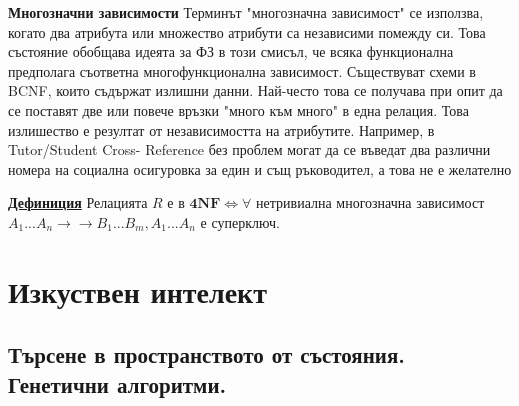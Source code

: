 \documentclass{article}
\begin{document}
\textbf{Многозначни зависимости}
Терминът "многозначна зависимост" се използва, когато два атрибута или множество атрибути са независими помежду си. Това
състояние обобщава идеята за ФЗ в този смисъл, че всяка функционална предполага съответна многофункционална зависимост.
Съществуват схеми в BCNF, които съдържат излишни данни. Най-често това се получава при опит да се поставят две или повече
връзки "много към много" в една релация. Това излишество е резултат от независимостта на атрибутите. Например, в Tutor/Student Cross-
Reference без проблем могат да се въведат два различни номера на социална осигуровка за един и същ ръководител, а това не е желателно

\textbf{\underline{Дефиниция}}
Релацията $R$ е в $\mathbf{4NF} \iff \forall$ нетривиална многозначна зависимост
$A_1...A_n \rightarrow\rightarrow B_1...B_m, A_1...A_n$ е суперключ.  

\section*{Изкуствен интелект}

\subsection*{Търсене в пространството от състояния. Генетични алгоритми.}
\end{document}
